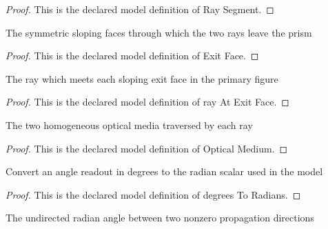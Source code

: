 \begin{proof}
  This is the declared model definition of Ray Segment.
\end{proof}
\begin{definition}
  \label{def:physics:phyx-mini-0099:phyxminiproblems-problemphyxmini0099-exitface}
  The symmetric sloping faces through which the two rays leave the prism
\end{definition}
\begin{proof}
  This is the declared model definition of Exit Face.
\end{proof}
\begin{definition}
  \label{def:physics:phyx-mini-0099:phyxminiproblems-problemphyxmini0099-rayatexitface}
  The ray which meets each sloping exit face in the primary figure
\end{definition}
\begin{proof}
  This is the declared model definition of ray At Exit Face.
\end{proof}
\begin{definition}
  \label{def:physics:phyx-mini-0099:phyxminiproblems-problemphyxmini0099-opticalmedium}
  The two homogeneous optical media traversed by each ray
\end{definition}
\begin{proof}
  This is the declared model definition of Optical Medium.
\end{proof}
\begin{definition}
  \label{def:physics:phyx-mini-0099:phyxminiproblems-problemphyxmini0099-degreestoradians}
  Convert an angle readout in degrees to the radian scalar used in the model
\end{definition}
\begin{proof}
  This is the declared model definition of degrees To Radians.
\end{proof}
\begin{definition}
  \label{def:physics:phyx-mini-0099:phyxminiproblems-problemphyxmini0099-anglebetweendirections}
  The undirected radian angle between two nonzero propagation directions
\end{definition}
